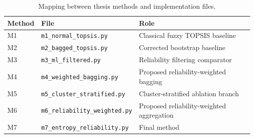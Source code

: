 \begin{table}[H]
\centering
\small
\caption{Mapping between thesis methods and implementation files.}
\label{tab:code-mapping}
\begin{tabular}{lll}
\toprule
Method & File & Role \\
\midrule
M1 & \texttt{m1\_normal\_topsis.py} & Classical fuzzy TOPSIS baseline \\
M2 & \texttt{m2\_bagged\_topsis.py} & Corrected bootstrap baseline \\
M3 & \texttt{m3\_ml\_filtered.py} & Reliability filtering comparator \\
M4 & \texttt{m4\_weighted\_bagging.py} & Proposed reliability-weighted bagging \\
M5 & \texttt{m5\_cluster\_stratified.py} & Cluster-stratified ablation branch \\
M6 & \texttt{m6\_reliability\_weighted.py} & Proposed reliability-weighted aggregation \\
M7 & \texttt{m7\_entropy\_reliability.py} & Final \methodname{} method \\
\bottomrule
\end{tabular}
\end{table}
